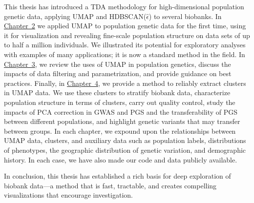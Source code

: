 This thesis has introduced a TDA methodology for high-dimensional population genetic data, applying UMAP and HDBSCAN($\hat{\epsilon}$) to several biobanks. In \hyperref[chap:chapter2]{Chapter~2} we applied UMAP to population genetic data for the first time, using it for visualization and revealing fine-scale population structure on data sets of up to half a million individuals. We illustrated its potential for exploratory analyses with examples of many applications; it is now a standard method in the field. In \hyperref[chap:chapter3]{Chapter~3}, we review the uses of UMAP in population genetics, discuss the impacts of data filtering and parametrization, and provide guidance on best practices. Finally, in \hyperref[chap:chapter4]{Chapter~4}, we provide a method to reliably extract clusters in UMAP data. We use these clusters to stratify biobank data, characterize population structure in terms of clusters, carry out quality control, study the impacts of PCA correction in GWAS and PGS and the transferability of PGS between different populations, and highlight genetic variants that may transfer between groups. In each chapter, we expound upon the relationships between UMAP data, clusters, and auxiliary data such as population labels, distributions of phenotypes, the geographic distribution of genetic variation, and demographic history. In each case, we have also made our code and data publicly available. 

In conclusion, this thesis has established a rich basis for deep exploration of biobank data---a method that is fast, tractable, and creates compelling visualizations that encourage investigation.

\clearpage


